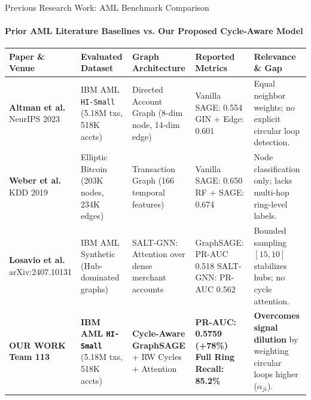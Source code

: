 \documentclass[aspectratio=169, 11pt]{beamer}
\begin{document}
\begin{frame}{Previous Research Work: AML Benchmark Comparison}
    \framesubtitle{Prior AML Literature Baselines vs. Our Proposed Cycle-Aware Model}
    \vspace{-0.3cm}
    \centering
    \renewcommand{\arraystretch}{0.98}
    \scriptsize
    \begin{tabularx}{\textwidth}{p{2.2cm} p{2.2cm} p{2.4cm} p{2.8cm} X}
        \toprule
        \textbf{Paper \& Venue} & \textbf{Evaluated Dataset} & \textbf{Graph Architecture} & \textbf{Reported Metrics} & \textbf{Relevance \& Gap} \\
        \midrule
        \textbf{Altman et al.} \newline NeurIPS 2023 & IBM AML \texttt{HI-Small} \newline (5.18M txs, 518K accts) & Directed Account Graph \newline (8-dim node, 14-dim edge) & Vanilla SAGE: 0.554 \newline GIN + Edge: 0.601 & Equal neighbor weights; no explicit circular loop detection. \\
        \addlinespace[2pt]
        \textbf{Weber et al.} \newline KDD 2019 & Elliptic Bitcoin \newline (203K nodes, 234K edges) & Transaction Graph \newline (166 temporal features) & Vanilla SAGE: 0.650 \newline RF + SAGE: 0.674 & Node classification only; lacks multi-hop ring-level labels. \\
        \addlinespace[2pt]
        \textbf{Losavio et al.} \newline arXiv:2407.10131 & IBM AML Synthetic \newline (Hub-dominated graphs) & SALT-GNN: Attention over \newline dense merchant accounts & GraphSAGE: PR-AUC 0.518 \newline SALT-GNN: PR-AUC 0.562 & Bounded sampling $[15, 10]$ stabilizes hubs; no cycle attention. \\
        \addlinespace[2pt]
        \rowcolor{cardBg}
        \textbf{OUR WORK} \newline \textbf{Team 113} & \textbf{IBM AML \texttt{HI-Small}} \newline (5.18M txs, 518K accts) & \textbf{Cycle-Aware GraphSAGE} \newline + RW Cycles + Attention & \textbf{PR-AUC: 0.5759 (+78\%)} \newline \textbf{Full Ring Recall: 85.2\%} & \textbf{Overcomes signal dilution} by weighting circular loops higher ($\alpha_{ji}$). \\
        \bottomrule
    \end{tabularx}
\end{frame}
\end{document}
